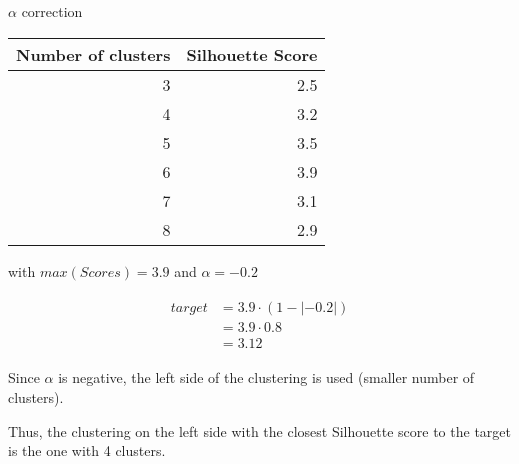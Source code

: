 \begin{example}
  \centering
  \caption{$\alpha$ correction}
  \label{ex:alpha_correction}

  \begin{tabular}{r r}
    \toprule
    Number of clusters & Silhouette Score \\
    \midrule
    3 & 2.5 \\
    4 & 3.2 \\
    5 & 3.5 \\
    6 & 3.9 \\
    7 & 3.1 \\
    8 & 2.9 \\
    \bottomrule
  \end{tabular}

  \vspace{0.5cm}

  \raggedright
  with $max(Scores) = 3.9$ and $\alpha = -0.2$

  \begin{gather*}
    \begin{aligned}
    target &= 3.9 \cdot (1 - |-0.2|) \\
           &= 3.9 \cdot 0.8 \\
           &= 3.12
     \end{aligned}
   \end{gather*}

  \vspace{0.5cm}

  Since $\alpha$ is negative, the left side of the clustering is used (smaller number of clusters).

  Thus, the clustering on the left side with the closest Silhouette score to the target is the one with 4 clusters.
\end{example}

\begin{table}
  \centering
  \caption{Silhouette-based clustering evaluation on retained rank lists, average  $B^3_{F_1}$/$r_{diff}$, $\alpha = -0.2$}
  \label{tab:silhouette-based_clustering_alpha}

\end{table}
